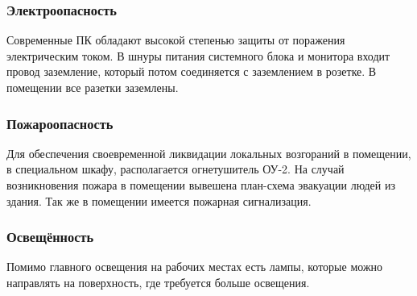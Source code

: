 \subsubsection{Электроопасность}

Современные ПК обладают высокой степенью защиты от поражения электрическим током.
В шнуры питания системного блока и монитора входит провод заземление,
который потом соединяется с заземлением в розетке. В помещении все разетки заземлены.

\subsubsection{Пожароопасность}

Для обеспечения своевременной ликвидации локальных возгораний в помещении,
в специальном шкафу, располагается огнетушитель ОУ-2. На случай возникновения
пожара в помещении вывешена план-схема эвакуации людей из здания. Так же в 
помещении имеется пожарная сигнализация.

\subsubsection{Освещённость}

Помимо главного освещения на рабочих местах есть лампы, которые можно направлять
на поверхность, где требуется больше освещения.
